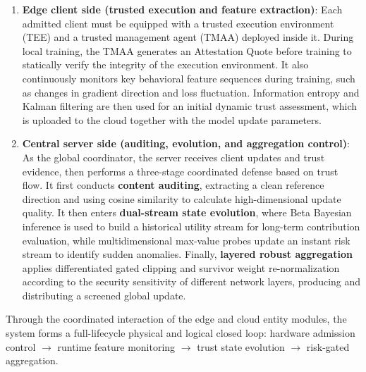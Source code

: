 \documentclass[11pt, a4paper]{article}
\begin{document}
\begin{enumerate}
    \item \textbf{Edge client side (trusted execution and feature extraction)}: Each admitted client must be equipped with a trusted execution environment (TEE) and a trusted management agent (TMAA) deployed inside it. During local training, the TMAA generates an Attestation Quote before training to statically verify the integrity of the execution environment. It also continuously monitors key behavioral feature sequences during training, such as changes in gradient direction and loss fluctuation. Information entropy and Kalman filtering are then used for an initial dynamic trust assessment, which is uploaded to the cloud together with the model update parameters.

    \item \textbf{Central server side (auditing, evolution, and aggregation control)}: As the global coordinator, the server receives client updates and trust evidence, then performs a three-stage coordinated defense based on trust flow. It first conducts \textbf{content auditing}, extracting a clean reference direction and using cosine similarity to calculate high-dimensional update quality. It then enters \textbf{dual-stream state evolution}, where Beta Bayesian inference is used to build a historical utility stream for long-term contribution evaluation, while multidimensional max-value probes update an instant risk stream to identify sudden anomalies. Finally, \textbf{layered robust aggregation} applies differentiated gated clipping and survivor weight re-normalization according to the security sensitivity of different network layers, producing and distributing a screened global update.
\end{enumerate}

Through the coordinated interaction of the edge and cloud entity modules, the system forms a full-lifecycle physical and logical closed loop: hardware admission control $\to$ runtime feature monitoring $\to$ trust state evolution $\to$ risk-gated aggregation.
\end{document}
